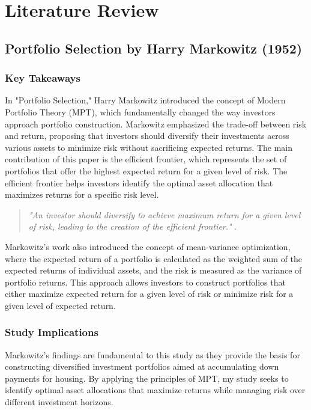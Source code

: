 \section{Literature Review}

\subsection{Portfolio Selection by Harry Markowitz (1952)}

\subsubsection{Key Takeaways}
In "Portfolio Selection," Harry Markowitz introduced the concept of Modern Portfolio Theory (MPT), which fundamentally changed the way investors approach portfolio construction. Markowitz emphasized the trade-off between risk and return, proposing that investors should diversify their investments across various assets to minimize risk without sacrificing expected returns. The main contribution of this paper is the efficient frontier, which represents the set of portfolios that offer the highest expected return for a given level of risk. The efficient frontier helps investors identify the optimal asset allocation that maximizes returns for a specific risk level.

\begin{quote}
\textit{"An investor should diversify to achieve maximum return for a given level of risk, leading to the creation of the efficient frontier."} \citep{markowitz1952portfolio}.
\end{quote}

Markowitz's work also introduced the concept of mean-variance optimization, where the expected return of a portfolio is calculated as the weighted sum of the expected returns of individual assets, and the risk is measured as the variance of portfolio returns. This approach allows investors to construct portfolios that either maximize expected return for a given level of risk or minimize risk for a given level of expected return.

\subsubsection{Study Implications}
Markowitz's findings are fundamental to this study as they provide the basis for constructing diversified investment portfolios aimed at accumulating down payments for housing. By applying the principles of MPT, my study seeks to identify optimal asset allocations that maximize returns while managing risk over different investment horizons.


